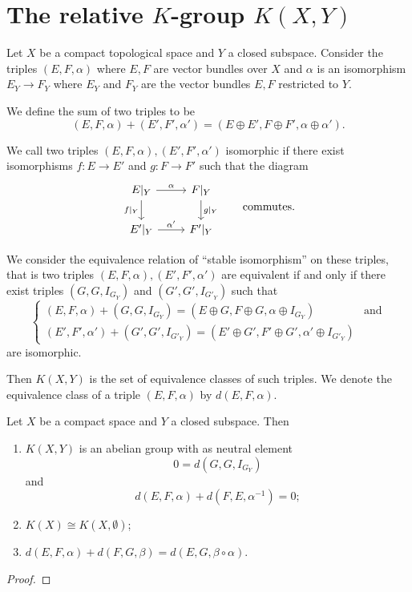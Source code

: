 \section{The relative $K$-group $K(X,Y)$}
\begin{definition}
Let $X$ be a compact topological space and $Y$ a closed subspace. Consider the triples $(E,F,\alpha)$ where $E,F$ are vector bundles over $X$ and $\alpha$ is an isomorphism $E_Y \to F_Y$ where $E_Y$ and $F_Y$ are the vector bundles $E,F$ restricted to $Y$.

We define the sum of two triples to be
\[ (E,F,\alpha) + (E',F',\alpha') = (E\oplus E',F\oplus F',\alpha\oplus\alpha'). \]

We call two triples $(E,F,\alpha), (E',F',\alpha')$ isomorphic if there exist isomorphisms $f:E\to E'$ and $g:F\to F'$ such that the diagram
\[ \begin{tikzcd}
E|_Y \rar{\alpha} \dar[swap]{f|_Y} & F|_Y \dar{g|_Y} \\
E'|_Y \rar{\alpha'} & F'|_Y
\end{tikzcd} \qquad \text{commutes.}\]

We consider the equivalence relation of ``stable isomorphism'' on these triples, that is two triples $(E,F,\alpha), (E',F',\alpha')$ are equivalent if and only if there exist triples $(G,G,I_{G_Y})$ and $(G',G',I_{G'_Y})$ such that
\[ \begin{cases}
(E,F,\alpha)+(G,G,I_{G_Y}) = (E\oplus G,F\oplus G, \alpha\oplus I_{G_Y}) & \text{and} \\ (E',F',\alpha')+(G',G',I_{G'_Y}) = (E'\oplus G',F'\oplus G', \alpha'\oplus I_{G'_Y})
\end{cases} \]
are isomorphic.

Then $K(X,Y)$ is the set of equivalence classes of such triples. We denote the equivalence class of a triple $(E,F,\alpha)$ by $d(E,F,\alpha)$.
\end{definition}

\begin{proposition}
Let $X$ be a compact space and $Y$ a closed subspace. Then
\begin{enumerate}
\item $K(X,Y)$ is an abelian group with as neutral element
\[ 0 = d(G,G,I_{G_Y}) \]
and
\[ d(E,F,\alpha) + d(F,E,\alpha^{-1}) = 0; \]
\item $K(X) \cong K(X,\emptyset)$;
\item $d(E,F,\alpha)+d(F,G,\beta) = d(E,G,\beta\circ \alpha)$.
\end{enumerate}
\end{proposition}
\begin{proof}

\end{proof}

